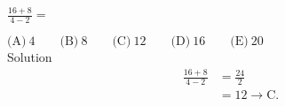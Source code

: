 

$\frac{16+8}{4-2}=$

$\text{(A)}\ 4 \qquad \text{(B)}\ 8 \qquad \text{(C)}\ 12 \qquad \text{(D)}\ 16 \qquad \text{(E)}\ 20$
\\
Solution
\\
\begin{align*} \frac{16+8}{4-2} &= \frac{24}{2} \\ &= 12\rightarrow \boxed{\text{C}}. \end{align*}
